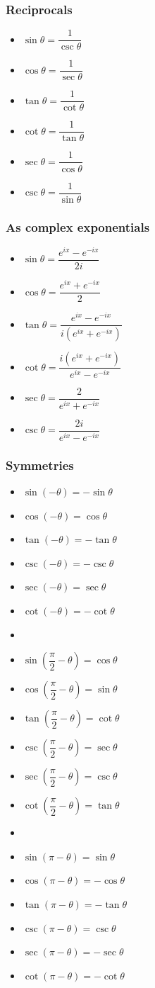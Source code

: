 \documentclass[]{report}
\newcommand \tab[1][1cm]{\hspace*{#1}}
\newcommand{\itemt}{\item \tab}
\begin{document}
\subsubsection{Reciprocals}
\begin{itemize}
\itemt \( \sin\theta = \dfrac{1}{\csc\theta} \)
\itemt \( \cos\theta = \dfrac{1}{\sec\theta} \)
\itemt \( \tan\theta = \dfrac{1}{\cot\theta} \)
\itemt \( \cot\theta = \dfrac{1}{\tan\theta} \)
\itemt \( \sec\theta = \dfrac{1}{\cos\theta} \)
\itemt \( \csc\theta = \dfrac{1}{\sin\theta} \)
\end{itemize}

\subsubsection{As complex exponentials}
\begin{itemize}
\itemt \( \sin\theta = \dfrac{e^{ix} - e^{-ix}}{2i} \)
\itemt \( \cos\theta = \dfrac{e^{ix} + e^{-ix}}{2} \)
\itemt \( \tan\theta = \dfrac{e^{ix} - e^{-ix}}{i(e^{ix} + e^{-ix})} \)
\itemt \( \cot\theta = \dfrac{i(e^{ix} + e^{-ix})}{e^{ix} - e^{-ix}} \)
\itemt \( \sec\theta = \dfrac{2}{e^{ix} + e^{-ix}} \)
\itemt \( \csc\theta = \dfrac{2i}{e^{ix} - e^{-ix}} \)
\end{itemize}

\subsubsection{Symmetries}
\begin{itemize}
\itemt \( \sin(-\theta) = -\sin\theta \)
\itemt \( \cos(-\theta) = \cos\theta \)
\itemt \( \tan(-\theta) = -\tan\theta \)
\itemt \( \csc(-\theta) = -\csc\theta \)
\itemt \( \sec(-\theta) = \sec\theta \)
\itemt \( \cot(-\theta) = -\cot\theta \)
\item[]
\itemt \( \sin(\dfrac{\pi}{2} - \theta) = \cos\theta \)
\itemt \( \cos(\dfrac{\pi}{2} - \theta) = \sin\theta \)
\itemt \( \tan(\dfrac{\pi}{2} - \theta) = \cot\theta \)
\itemt \( \csc(\dfrac{\pi}{2} - \theta) = \sec\theta \)
\itemt \( \sec(\dfrac{\pi}{2} - \theta) = \csc\theta \)
\itemt \( \cot(\dfrac{\pi}{2} - \theta) = \tan\theta \)
\item[]
\itemt \( \sin(\pi - \theta) = \sin\theta \)
\itemt \( \cos(\pi - \theta) = -\cos\theta \)
\itemt \( \tan(\pi - \theta) = -\tan\theta \)
\itemt \( \csc(\pi - \theta) = \csc\theta \)
\itemt \( \sec(\pi - \theta) = -\sec\theta \)
\itemt \( \cot(\pi - \theta) = -\cot\theta \)
\end{itemize}
\end{document}
